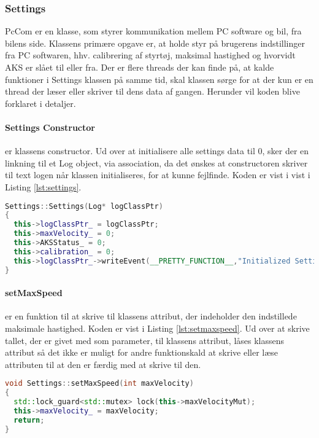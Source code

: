 \subsubsection{Settings} \label{sec:settings_impl}

PcCom er en klasse, som styrer kommunikation mellem PC software og bil, fra bilens side. Klassens primære opgave er, at holde styr på brugerens indstillinger fra PC softwaren, hhv. calibrering af styrtøj, maksimal hastighed og hvorvidt AKS er slået til eller fra.
Der er flere threads der kan finde på, at kalde funktioner i Settings klassen på samme tid, skal klassen sørge for at der kun er en thread der læser eller skriver til dens data af gangen.
Herunder vil koden blive forklaret i detaljer.


\paragraph{Settings Constructor} er klassens constructor. Ud over at initialisere alle settings data til 0, sker der en linkning til et Log object, via association, da det ønskes at constructoren skriver til text logen når klassen initialiseres, for at kunne fejlfinde. Koden er vist i vist i Listing \ref{lst:settings}.

\begin{lstlisting}[caption={Settings Constructor},label=lst:settings, language=c++]
Settings::Settings(Log* logClassPtr)
{
  this->logClassPtr_ = logClassPtr;
  this->maxVelocity_ = 0;
  this->AKSStatus_ = 0;
  this->calibration_ = 0;
  this->logClassPtr_->writeEvent(__PRETTY_FUNCTION__,"Initialized Settings")
}
\end{lstlisting}


\paragraph{setMaxSpeed} er en funktion til at skrive til klassens attribut, der indeholder den indstillede maksimale hastighed. Koden er vist i Listing \ref{lst:setmaxspeed}. Ud over at skrive tallet, der er givet med som parameter, til klassens attribut, låses klassens attribut så det ikke er muligt for andre funktionskald at skrive eller læse attributen til at den er færdig med at skrive til den. 

\begin{lstlisting}[caption={Funktionen setMaxSpeed},label=lst:setmaxspeed, language=c++]
void Settings::setMaxSpeed(int maxVelocity)
{
  std::lock_guard<std::mutex> lock(this->maxVelocityMut);
  this->maxVelocity_ = maxVelocity;
  return;
}
\end{lstlisting}



